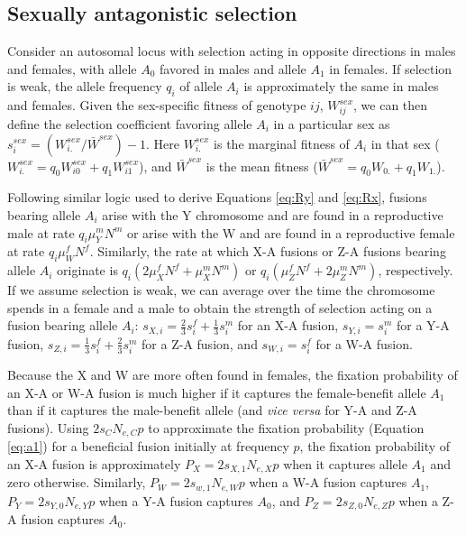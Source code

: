 \subsection{Sexually antagonistic selection}
Consider an autosomal locus with selection acting in opposite directions in males and females, with allele $A_0$ favored in males and allele $A_\text{1}$ in females. If selection is weak, the allele frequency $q_i$ of allele $A_i$ is approximately the same in males and females. Given the sex-specific fitness of genotype $ij$, $W^{sex}_{ij}$, we can then define the selection coefficient favoring allele $A_i$ in a particular sex as $s^{sex}_i=(W^{sex}_{i.}/\bar{W}^{sex})-\text{1}$. Here $W^{sex}_{i.}$ is the marginal fitness of $A_i$ in that sex ($W^{sex}_{i.}=q_0W^{sex}_{i0} + q_\text{1}W^{sex}_{i\text{1}}$), and $\bar{W}^{sex}$ is the mean fitness ($\bar{W}^{sex} = q_0W_{0.} + q_1W_{1.}$).

Following similar logic used to derive Equations \ref{eq:Ry} and \ref{eq:Rx}, fusions bearing allele $A_i$ arise with the Y chromosome and are found in a reproductive male at rate $q_i\mu^m_YN^m$  or arise with the W and are found in a reproductive female at rate $q_i\mu^f_WN^f$. Similarly, the rate at which X-A fusions or Z-A fusions bearing allele $A_i$ originate is $q_i(\text{2}\mu^f_XN^f + \mu^m_XN^m)$ or $q_i(\mu^f_ZN^f + \text{2}\mu^m_ZN^m)$, respectively. If we assume selection is weak, we can average over the time the chromosome spends in a female and a male to obtain the strength of selection acting on a fusion bearing allele $A_i$: $s_{X,i}=\frac{\text{2}}{\text{3}}s^f_i + \frac{\text{1}}{\text{3}}s^m_i$ for an X-A fusion, $s_{Y,i}=s^m_i$ for a Y-A fusion, $s_{Z,i}=\frac{\text{1}}{\text{3}}s^f_i + \frac{\text{2}}{\text{3}}s^m_i$  for a Z-A fusion, and $s_{W,i}=s^f_i$ for a W-A fusion.
 
Because the X and W are more often found in females, the fixation probability of an X-A or W-A fusion is much higher if it captures the female-benefit allele $A_{\text{1}}$ than if it captures the male-benefit allele (and \emph{vice versa} for Y-A and Z-A fusions). Using $\text{2}s_CN_{e,C}p$ to approximate the fixation probability (Equation \ref{eq:a1}) for a beneficial fusion initially at frequency $p$, the fixation probability of an X-A fusion is approximately $P_{X}=\text{2}s_{X,\text{1}}N_{e,X}p$ when it captures allele $A_{\text{1}}$ and zero otherwise. Similarly, $P_W = \text{2}s_{w,\text{1}}N_{e,W}p$ when a W-A fusion captures $A_\text{1}$, $P_Y = \text{2}s_{Y,0}N_{e,Y}p$ when a Y-A fusion captures $A_0$, and $P_Z=\text{2}s_{Z,0}N_{e,Z}p$ when a Z-A fusion captures $A_{\text{0}}$.

